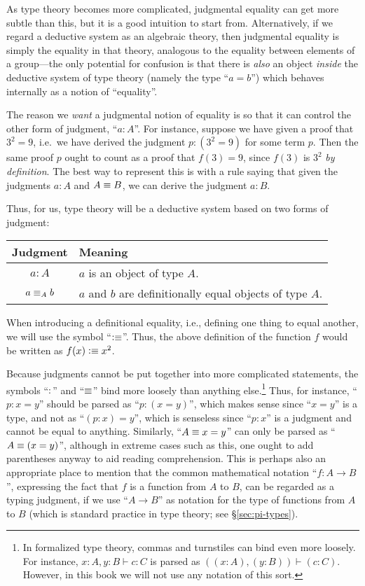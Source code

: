 As type theory becomes more complicated, judgmental equality can get more subtle than this, but it is a good intuition to start from.
Alternatively, if we regard a deductive system as an algebraic theory, then judgmental equality is simply the equality in that theory, analogous to the equality between elements of a group---the only potential for confusion is that there is \emph{also} an object \emph{inside} the deductive system of type theory (namely the type ``$a=b$'') which behaves internally as a notion of ``equality''.

The reason we \emph{want} a judgmental notion of equality is so that it can control the other form of judgment, ``$a:A$''.
For instance, suppose we have given a proof that $3^2=9$, i.e.\ we have derived the judgment $p:(3^2=9)$ for some term $p$.
Then the same proof $p$ ought to count as a proof that $f(3)=9$, since $f(3)$ is $3^2$ \emph{by definition}.
The best way to represent this is with a rule saying that given the judgments $a:A$ and $A\equiv B$, we can derive the judgment $a:B$.

Thus, for us, type theory will be a deductive system based on two forms of judgment:
\begin{center}
\begin{tabular}{c|l}
  \textbf{Judgment} & \textbf{Meaning}\\\hline
  $a : A$ & $a$ is an object of type $A$.\\
  $a \equiv_A b$ & $a$ and $b$ are definitionally equal objects of type $A$.
\end{tabular}
\end{center}
When introducing a definitional equality, i.e., defining one thing to equal another, we will use the symbol ``$\vcentcolon\equiv$''.
Thus, the above definition of the function $f$ would be written as $f(x)\vcentcolon\equiv x^2$.

Because judgments cannot be put together into more complicated statements, the symbols ``$:$'' and ``$\equiv$'' bind more loosely than anything else.\footnote{In formalized type theory, commas and turnstiles can bind even more loosely.
  For instance, $x:A,y:B\vdash c:C$ is parsed as $((x:A),(y:B))\vdash (c:C)$.
  However, in this book we will not use any notation of this sort.}
Thus, for instance, ``$p:x=y$'' should be parsed as ``$p:(x=y)$'', which makes sense since ``$x=y$'' is a type, and not as ``$(p:x)=y$'', which is senseless since ``$p:x$'' is a judgment and cannot be equal to anything.
Similarly, ``$A\equiv x=y$'' can only be parsed as ``$A\equiv(x=y)$'', although in extreme cases such as this, one ought to add parentheses anyway to aid reading comprehension.
This is perhaps also an appropriate place to mention that the common mathematical notation ``$f:A\to B$'', expressing the fact that $f$ is a function from $A$ to $B$, can be regarded as a typing judgment, if we use ``$A\to B$'' as notation for the type of functions from $A$ to $B$ (which is standard practice in type theory; see \S\ref{sec:pi-types}).

